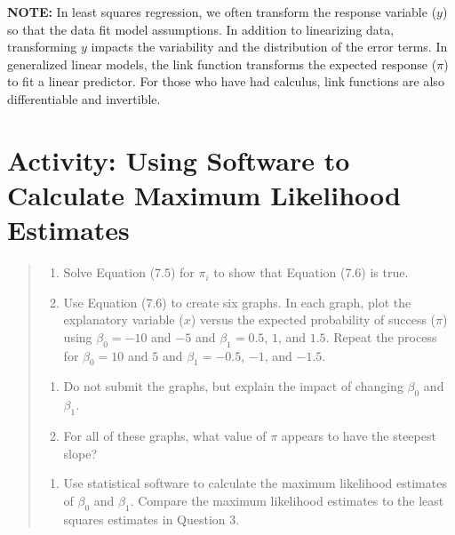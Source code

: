 \documentclass[
]{report}
\providecommand{\tightlist}{%
  \setlength{\itemsep}{0pt}\setlength{\parskip}{0pt}}
\begin{document}
\large

\textbf{NOTE:} In least squares regression, we often transform the response variable (\(y\)) so that the data fit model assumptions. In addition to linearizing data, transforming \(y\) impacts the variability and the distribution of the error terms. In generalized linear models, the link function transforms the expected response (\(\pi\)) to fit a linear predictor. For those who have had calculus, link functions are also differentiable and invertible.
\normalsize

\hypertarget{activity-using-software-to-calculate-maximum-likelihood-estimates-1}{%
\section*{Activity: Using Software to Calculate Maximum Likelihood Estimates}\label{activity-using-software-to-calculate-maximum-likelihood-estimates-1}}

\begin{quote}
\begin{enumerate}
\def\labelenumi{\arabic{enumi}.}
\setcounter{enumi}{3}
\tightlist
\item
  Solve Equation (7.5) for \(\pi_i\) to show that Equation (7.6) is true.\\
\item
  Use Equation (7.6) to create six graphs. In each graph, plot the explanatory variable (\(x\)) versus the expected probability of success (\(\pi\)) using \(\beta_0 = -10\) and \(-5\) and \(\beta_1 = 0.5\), \(1\), and \(1.5\). Repeat the process for \(\beta_0 = 10\) and \(5\) and \(\beta_1 = -0.5\), \(-1\), and \(-1.5\).\\
\end{enumerate}

\begin{enumerate}
\def\labelenumi{\alph{enumi}.}
\tightlist
\item
  Do not submit the graphs, but explain the impact of changing \(\beta_0\) and \(\beta_1\).\\
\item
  For all of these graphs, what value of \(\pi\) appears to have the steepest slope?\\
\end{enumerate}

\begin{enumerate}
\def\labelenumi{\arabic{enumi}.}
\setcounter{enumi}{5}
\tightlist
\item
  Use statistical software to calculate the maximum likelihood estimates of \(\beta_0\) and \(\beta_1\). Compare the maximum likelihood estimates to the least squares estimates in Question 3.
\end{enumerate}
\end{quote}
\end{document}
